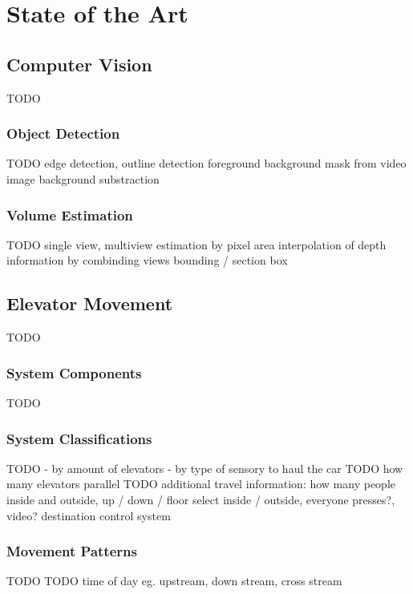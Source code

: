 \chapter{State of the Art}
\label{chap:sota}

\section{Computer Vision}

TODO

\subsection{Object Detection}

TODO
edge detection, outline detection
foreground background mask from video image
background substraction

\subsection{Volume Estimation}

TODO
single view, multiview
estimation by pixel area
interpolation of depth information by combinding views
bounding / section box

\section{Elevator Movement}
TODO

\subsection{System Components}
TODO

\subsection{System Classifications}
TODO
- by amount of elevators
- by type of sensory to haul the car
TODO how many elevators parallel
TODO additional travel information: how many people inside and outside, up / down / floor select inside / outside, everyone presses?, video? 
destination control system

\subsection{Movement Patterns}
TODO
TODO time of day eg. upstream, down stream, cross stream

